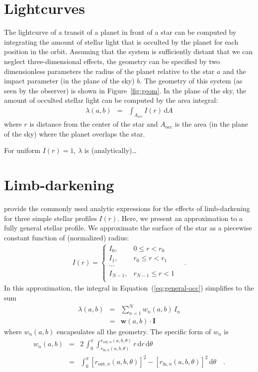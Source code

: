 \documentclass[12pt,preprint]{aastex}
\newcommand{\Fig}[1]{Figure~\ref{fig:#1}}
\newcommand{\fig}[1]{\Fig{#1}}
\newcommand{\Eq}[1]{Equation~(\ref{eq:#1})}
\newcommand{\eq}[1]{\Eq{#1}}
\newcommand{\eqlabel}[1]{\label{eq:#1}}
\newcommand{\dd}{\mathrm{d}}
\newcommand{\bvec}[1]{\boldsymbol{#1}}
\begin{document}
\section{Lightcurves}

The lightcurve of a transit of a planet in front of a star can be computed by
integrating the amount of stellar light that is occulted by the planet for
each position in the orbit. Assuming that the system is sufficiently distant
that we can neglect three-dimensional effects, the geometry can be specified
by two dimensionless parameters the radius of the planet relative to the
star $a$ and the impact parameter (in the plane of the sky) $b$. The geometry
of this system (as seen by the observer) is shown in \fig{geom}. In the plane
of the sky, the amount of occulted stellar light can be computed by the area
integral:
\begin{eqnarray}\eqlabel{general-occ}
    \lambda (a, b) & = & \int_{A_\mathrm{occ}} I(r) \, \dd A
\end{eqnarray}
where $r$ is distance from the center of the star and $A_\mathrm{occ}$ is the
area (in the plane of the sky) where the planet overlaps the star.

For uniform $I(r) = 1$, $\lambda$ is (analytically)\ldots


\section{Limb-darkening}

\citet{mandel} provide the commonly used analytic expressions for the effects
of limb-darkening for three simple stellar profiles $I(r)$. Here, we present
an approximation to a fully general stellar profile. We approximate the
surface of the star as a piecewise constant function of (normalized) radius:
\begin{eqnarray}
    I(r) = \left \{ \begin{array}{ll}
        I_0, & 0 \le r < r_0 \\
        I_1, & r_0 \le r < r_1 \\
        \cdots & \\
        I_{N-1}, & r_{N-1} \le r < 1 \\
    \end{array}\right . \quad.
\end{eqnarray}
In this approximation, the integral in \eq{general-occ} simplifies to the sum
\begin{eqnarray}
    \lambda(a, b) & = & \sum_{n=1}^N w_n (a, b) \, I_n \\
                  & = & \bvec{w} (a, b) \cdot \bvec{I}
\end{eqnarray}
where $w_n(a, b)$ encapsulates all the geometry. The specific form of $w_n$ is
\begin{eqnarray}
    w_n (a, b) & = & 2 \, \int_0 ^\pi \int_{r_{\mathrm{in},n} (a, b, \theta)}
        ^{r_{\mathrm{out},n} (a, b, \theta)} r \, \dd r \, \dd \theta \\
    & = & \int_0 ^\pi [ r_{\mathrm{out},n} (a, b, \theta) ]^2  -
        [ r_{\mathrm{in},n} (a, b, \theta) ]^2 \, \dd \theta
    \quad.
\end{eqnarray}
\end{document}
